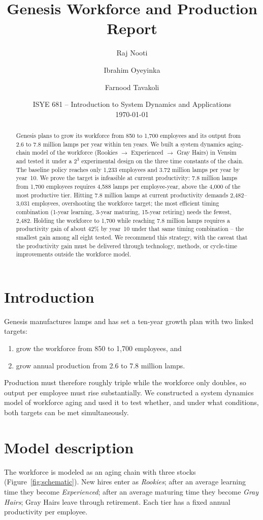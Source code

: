 \documentclass[11pt,a4paper]{article}
\title{Genesis Workforce and Production Report}
\author{Raj Nooti \and Ibrahim Oyeyinka \and Farnood Tavakoli}
\date{ISYE 681 -- Introduction to System Dynamics and Applications \\ \today}
\begin{document}
\maketitle

\begin{abstract}
Genesis plans to grow its workforce from 850 to 1,700 employees and its output
from 2.6 to 7.8 million lamps per year within ten years. We built a system
dynamics aging-chain model of the workforce (Rookies $\to$ Experienced
$\to$ Gray Hairs) in Vensim and tested it under a $2^3$ experimental design on
the three time constants of the chain. The baseline policy reaches only
1,233 employees and 3.72 million lamps per year by year~10. We prove the
target is infeasible at current productivity: 7.8 million lamps from
1,700 employees requires 4,588 lamps per employee-year, above the 4,000 of
the most productive tier. Hitting 7.8 million lamps at current productivity
demands 2,482--3,031 employees, overshooting the workforce target; the most
efficient timing combination (1-year learning, 3-year maturing, 15-year
retiring) needs the fewest, 2,482. Holding the workforce to 1,700 while
reaching 7.8 million lamps requires a productivity gain of about 42\% by
year~10 under that same timing combination -- the smallest gain among all
eight tested. We recommend this strategy, with the caveat that the
productivity gain must be delivered through technology, methods, or cycle-time
improvements outside the workforce model.
\end{abstract}

\section{Introduction}
Genesis manufactures lamps and has set a ten-year growth plan with two
linked targets:
\begin{enumerate}
    \item grow the workforce from 850 to 1,700 employees, and
    \item grow annual production from 2.6 to 7.8 million lamps.
\end{enumerate}
Production must therefore roughly triple while the workforce only doubles, so
output per employee must rise substantially. We constructed a system dynamics
model of workforce aging and used it to test whether, and under what
conditions, both targets can be met simultaneously.

\section{Model description}
The workforce is modeled as an aging chain with three stocks (Figure~\ref{fig:schematic}).
New hires enter as \textit{Rookies}; after an average learning time they
become \textit{Experienced}; after an average maturing time they become
\textit{Gray Hairs}; Gray Hairs leave through retirement. Each tier has a
fixed annual productivity per employee.
\end{document}

